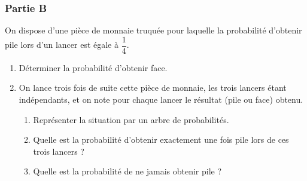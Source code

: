 \subsubsection*{Partie B}
On dispose d'une pièce de monnaie truquée pour laquelle la probabilité d'obtenir pile lors d'un lancer est égale à $\dfrac{1}{4}$.

\begin{enumerate}
\item Déterminer la probabilité d'obtenir face.

\item On lance trois fois de suite cette pièce de monnaie, les trois lancers étant indépendants, et on note pour chaque lancer le résultat (pile ou face) obtenu.

\begin{enumerate}
\item Représenter la situation par un arbre de probabilités.

\item Quelle est la probabilité d'obtenir exactement une fois pile lors de ces trois lancers ?

\item Quelle est la probabilité de ne jamais obtenir pile ?
\end{enumerate}
\end{enumerate}
